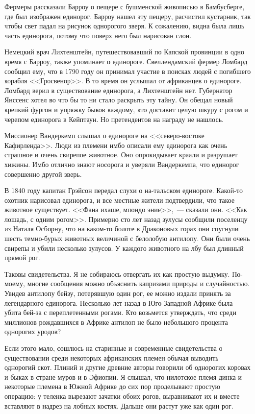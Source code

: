 \documentclass[12pt,a4paper,twoside,openany,svgnames]{memoir}
\begin{document}
Фермеры рассказали Барроу о пещере с бушменской живописью в Бамбусберге, где был изображен единорог. Барроу нашел эту пещеру, расчистил кустарник, так чтобы свет падал на рисунок однорогого зверя. К сожалению, видна была лишь часть единорога, потому что поверх него был нарисован слон.

Немецкий врач Лихтенштейн, путешествовавший по Капской провинции в одно время с Барроу, также упоминает о единороге. Свеллендамский фермер Ломбард сообщил ему, что в 1790 году он принимал участие в поисках людей с погибшего корабля <<Гросвенор>>. В то время он услышал от африканцев о единороге. Ломбард верил в существование единорога, а Лихтенштейн нет. Губернатор Янссенс хотел во что бы то ни стало раскрыть эту тайну. Он обещал новый крепкий фургон и упряжку быков каждому, кто доставит целую шкуру с рогом и черепом единорога в Кейптаун. Но претендентов на награду не нашлось.

Миссионер Вандеркемп слышал о единороге на <<северо-востоке Кафирленда>>. Люди из племени имбо описали ему единорога как очень страшное и очень свирепое животное. Оно опрокидывает краали и разрушает хижины. Имбо отлично знают носорога и уверяли Вандеркемпа, что единорог совершенно другой зверь.

В 1840 году капитан Грэйсон передал слухи о на-тальском единороге. Какой-то охотник нарисовал единорога, и все местные жители подтвердили, что такое животное существует. <<Фана ихаше, мпондо эние>>,~--- сказали они. <<Как лошадь, с одним рогом>>. Примерно сто лет назад зулусы сообщили поселенцу из Наталя Осборну, что на каком-то болоте в Драконовых горах они спугнули шесть темно-бурых животных величиной с белолобую антилопу. Они были очень свирепы и убили несколько зулусов. У каждого животного на лбу был длинный прямой рог.

Таковы свидетельства. Я не собираюсь отвергать их как простую выдумку. По-моему, многие сообщения можно объяснить капризами природы и случайностью. Увидев антилопу бейзу, потерявшую один рог, ее можно издали принять за легендарного единорога. Несколько лет назад в Юго-Западной Африке была убита бей-за с переплетенными рогами. Кто возьмется утверждать, что среди миллионов рождавшихся в Африке антилоп не было небольшого процента однорогих уродов?

Если этого мало, сошлюсь на старинные и современные свидетельства о существовании среди некоторых африканских племен обычая выводить однорогий скот. Плиний и другие древние авторы говорили об однорогих коровах и быках в стране муров и в Эфиопии. Я слышал, что нилотское племя динка и некоторые племена в Южной Африке до сих пор проделывают простую операцию: у теленка вырезают зачатки обоих рогов, выравнивают их и вместе вставляют в надрез на лобных костях. Дальше они растут уже как один рог.
\end{document}
